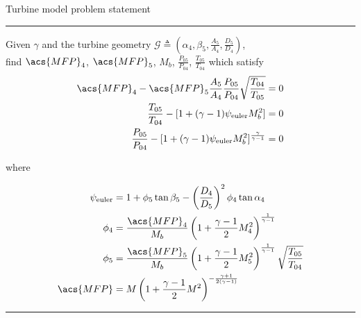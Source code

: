 \begin{table}
\centering
\caption{Turbine model problem statement}
\label{map:turbine}
\begin{minipage}{0.7\textwidth}
    \hrule

    Given $\gamma$ and the turbine geometry 
    $\mathcal{G} \triangleq \left(
    \alpha_4, \beta_5, \tfrac{A_5}{A_4}, \tfrac{D_{5}}{D_4} \right)$, \\
    find $\acs{MFP}_4$, $\acs{MFP}_5$, $M_b$, $\frac{P_{05}}{P_{04}}$, $\frac{T_{05}}{T_{04}}$ 
    which satisfy
\begin{align}
    \acs{MFP}_4 - \acs{MFP}_5\frac{A_5}{A_4}\frac{P_{05}}{P_{04}}\sqrt{\frac{T_{04}}{T_{05}}}    &= 0 \\
    \frac{T_{05}}{T_{04}} - [1 + (\gamma-1)\psi_{\text{euler}} M_b^2]                           &= 0 \\
    \frac{P_{05}}{P_{04}} - [1 + (\gamma-1)\psi_{\text{euler}} M_b^2]^{\frac{\gamma}{\gamma-1}} &= 0 \label{eqn:turb_res_pr}
\end{align}

where

\begin{align}
    \psi_{\text{euler}} & = 1 + \phi_5\tan\beta_5-\left(\frac{D_4}{D_5}\right)^2\phi_4\tan\alpha_4 \\
    \phi_4 &= \frac{\acs{MFP}_4}{M_b} \left( 1 + \frac{\gamma-1}{2} M_4^2 \right)^{\frac{1}{\gamma-1}} \\
    \phi_5 &= \frac{\acs{MFP}_5}{M_b} \left( 1 + \frac{\gamma-1}{2} M_5^2 \right)^{\frac{1}{\gamma-1}} \sqrt{\frac{T_{05}}{T_{04}}}\\
    \acs{MFP} &= M \left( 1 + \frac{\gamma-1}{2} M^2 \right)^{-\frac{\gamma+1}{2(\gamma-1)}}
\end{align}

    \hrule
\end{minipage}
\end{table}

